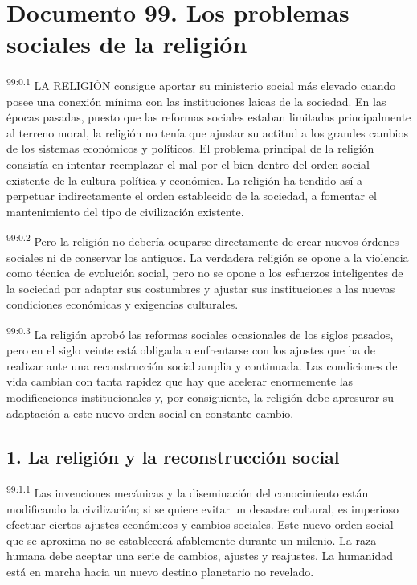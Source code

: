 \chapter{Documento 99. Los problemas sociales de la religión}
\par
\textsuperscript{99:0.1} LA RELIGIÓN consigue aportar su ministerio social más elevado cuando posee una conexión mínima con las instituciones laicas de la sociedad. En las épocas pasadas, puesto que las reformas sociales estaban limitadas principalmente al terreno moral, la religión no tenía que ajustar su actitud a los grandes cambios de los sistemas económicos y políticos. El problema principal de la religión consistía en intentar reemplazar el mal por el bien dentro del orden social existente de la cultura política y económica. La religión ha tendido así a perpetuar indirectamente el orden establecido de la sociedad, a fomentar el mantenimiento del tipo de civilización existente.

\par
\textsuperscript{99:0.2} Pero la religión no debería ocuparse directamente de crear nuevos órdenes sociales ni de conservar los antiguos. La verdadera religión se opone a la violencia como técnica de evolución social, pero no se opone a los esfuerzos inteligentes de la sociedad por adaptar sus costumbres y ajustar sus instituciones a las nuevas condiciones económicas y exigencias culturales.

\par
\textsuperscript{99:0.3} La religión aprobó las reformas sociales ocasionales de los siglos pasados, pero en el siglo veinte está obligada a enfrentarse con los ajustes que ha de realizar ante una reconstrucción social amplia y continuada. Las condiciones de vida cambian con tanta rapidez que hay que acelerar enormemente las modificaciones institucionales y, por consiguiente, la religión debe apresurar su adaptación a este nuevo orden social en constante cambio.

\section*{1. La religión y la reconstrucción social}
\par
\textsuperscript{99:1.1} Las invenciones mecánicas y la diseminación del conocimiento están modificando la civilización; si se quiere evitar un desastre cultural, es imperioso efectuar ciertos ajustes económicos y cambios sociales. Este nuevo orden social que se aproxima no se establecerá afablemente durante un milenio. La raza humana debe aceptar una serie de cambios, ajustes y reajustes. La humanidad está en marcha hacia un nuevo destino planetario no revelado.

